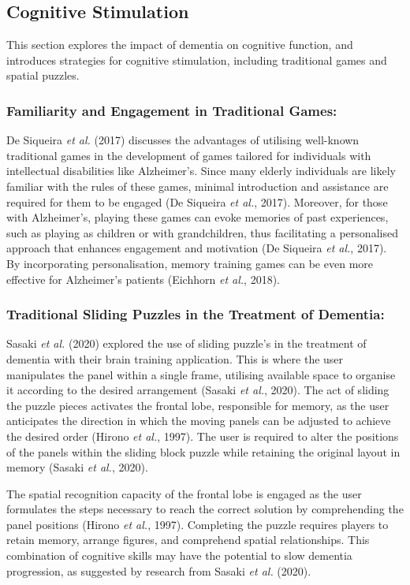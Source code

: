 \documentclass{l4proj}
\begin{document}
\subsection{Cognitive Stimulation}
This section explores the impact of dementia on cognitive function, and introduces strategies for cognitive stimulation, including traditional games and spatial puzzles.

\subsubsection{Familiarity and Engagement in Traditional Games:}\label{sec:traditional_games}
De Siqueira \emph{et al.} (2017) discusses the advantages of utilising well-known traditional games in the development of games tailored for individuals with intellectual disabilities like Alzheimer's. Since many elderly individuals are likely familiar with the rules of these games, minimal introduction and assistance are required for them to be engaged (De Siqueira \emph{et al.}, 2017). Moreover, for those with Alzheimer's, playing these games can evoke memories of past experiences, such as playing as children or with grandchildren, thus facilitating a personalised approach that enhances engagement and motivation (De Siqueira \emph{et al.}, 2017). By incorporating personalisation, memory training games can be even more effective for Alzheimer's patients (Eichhorn \emph{et al.}, 2018). \newline


\subsubsection{Traditional Sliding Puzzles in the Treatment of Dementia:}\label{sec:sliding_dementia}

Sasaki \emph{et al.} (2020) explored the use of sliding puzzle's in the treatment of dementia with their brain training application. This is where the user manipulates the panel within a single frame, utilising available space to organise it according to the desired arrangement (Sasaki \emph{et al.}, 2020). The act of sliding the puzzle pieces activates the frontal lobe, responsible for memory, as the user anticipates the direction in which the moving panels can be adjusted to achieve the desired order (Hirono \emph{et al.}, 1997). The user is required to alter the positions of the panels within the sliding block puzzle while retaining the original layout in memory (Sasaki \emph{et al.}, 2020).

The spatial recognition capacity of the frontal lobe is engaged as the user formulates the steps necessary to reach the correct solution by comprehending the panel positions (Hirono \emph{et al.}, 1997). Completing the puzzle requires players to retain memory, arrange figures, and comprehend spatial relationships. This combination of cognitive skills may have the potential to slow dementia progression, as suggested by research from Sasaki \emph{et al.} (2020). \newline
\end{document}
